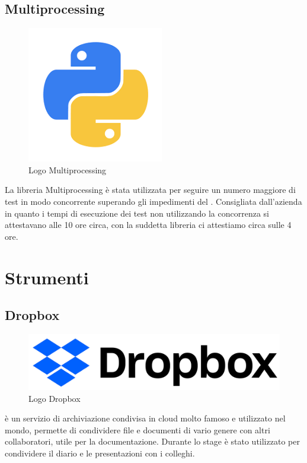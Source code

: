 \subsection{Multiprocessing}
\begin{figure}[H]
	\begin{center} \includegraphics[scale=0.5]{figures/python}
		\caption[Logo Multiprocessing]{Logo Multiprocessing}  
	\end{center}
\end{figure}
La libreria Multiprocessing è stata utilizzata per seguire un numero maggiore di test in modo concorrente superando gli impedimenti del . Consigliata dall'azienda in quanto i tempi di esecuzione dei test non utilizzando la concorrenza si attestavano alle 10 ore circa, con la suddetta libreria ci attestiamo circa sulle 4 ore.

\section{Strumenti}
\subsection{Dropbox}
\begin{figure}[H]
	\begin{center} \includegraphics[scale=0.2]{figures/dropbox_2017_logo}
		\caption[Logo Dropbox]{Logo Dropbox}  
	\end{center}
\end{figure}
 è un servizio di archiviazione condivisa in cloud molto famoso e utilizzato nel mondo, permette di condividere file e documenti di vario genere con altri collaboratori, utile per la documentazione. Durante lo stage è stato utilizzato per condividere il diario e le presentazioni con i colleghi.

